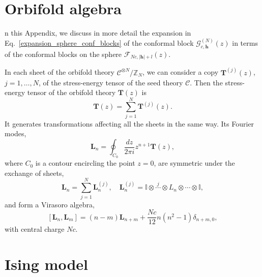 \documentclass[a4paper,11pt]{article}
\begin{document}
\section{Orbifold algebra}

n this Appendix, we discuss in more detail the expansion in Eq.~\eqref{expansion_sphere_conf_blocks} of the
conformal block $\mathcal{G}_{c, \boldsymbol{h}}^{(N)}(z)$ in terms of the conformal 
blocks on the sphere $\mathcal{F}_{Nc, |\boldsymbol{h}|+l}(z)$.

In each sheet of the orbifold theory $\mathcal{C}^{\otimes N}/\mathbb{Z}_N$, we 
can consider a copy $\boldsymbol{T}^{(j)}(z)$, $j=1,\dots, N$, of the stress-energy tensor of 
the seed theory $\mathcal{C}$. Then the stress-energy tensor of the 
orbifold theory $\boldsymbol{T}(z)$ is 
\begin{equation}\label{hatT}
 \boldsymbol{T}(z)=\sum_{j=1}^N \boldsymbol{T}^{(j)}(z).
\end{equation}
It generates transformations affecting all the sheets in the same way. 
Its Fourier modes,
\begin{equation}
 \boldsymbol{L}_n=\oint_{C_0}\frac{dz}{2\pi i} z^{n+1}\boldsymbol{T}(z),
\end{equation}
where $C_0$ is a contour encircling the point $z=0$, are symmetric 
under the exchange of sheets, 
\begin{equation}
 \boldsymbol{L}_n=\sum_{j=1}^N \boldsymbol{L}_n^{(j)}, \quad 
 \boldsymbol{L}_n^{(j)}=\mathbb{I}\otimes \overset{j}{\cdots} \otimes L_{n}\otimes \cdots \otimes \mathbb{I},
\end{equation}
and form a Virasoro algebra, 
\begin{equation}\label{symm_virasoro_alg}
 [\boldsymbol{L}_n, \boldsymbol{L}_{m}]=(n-m)\boldsymbol{L}_{n+m}+\frac{Nc}{12}n(n^2-1)\delta_{n+m, 0},
\end{equation}
with central charge $Nc$.
\section{Ising model}\label{app_ising}
\end{document}
